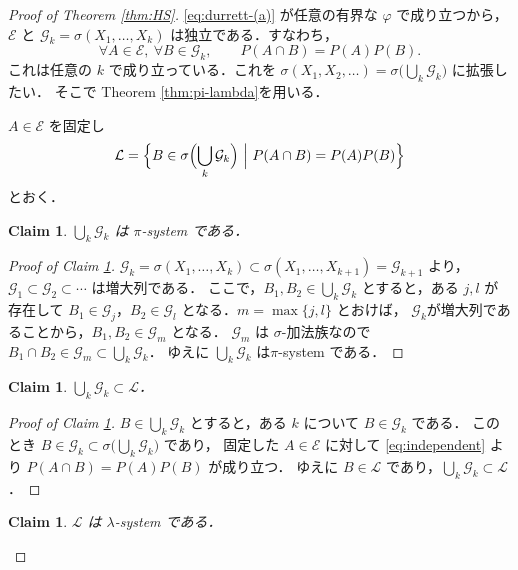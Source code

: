 \documentclass[a4paper,11pt,uplatex,dvipdfmx]{jsarticle}
\theoremstyle{plain}
\newtheorem{claim}[theorem]{Claim}
\theoremstyle{definition}
\begin{document}
\begin{proof}[Proof of Theorem \ref{thm:HS}]
\eqref{eq:durrett-(a)} が任意の有界な $\varphi$ で成り立つから，$\mathcal{E}$ と
$\mathcal{G}_k=\sigma(X_1,\dots,X_k)$ は独立である．すなわち，
\begin{equation}\label{eq:independent}
  \forall A\in\mathcal{E},\ \forall B\in\mathcal{G}_k,\qquad P(A\cap B)=P(A)P(B).
\end{equation}
これは任意の $k$ で成り立っている．これを
$\sigma(X_1,X_2,\dots)=\sigma\bigl(\bigcup_k\mathcal{G}_k\bigr)$ に拡張したい．
そこで Theorem \ref{thm:pi-lambda}を用いる．

$A\in\mathcal{E}$ を固定し
\[
  \mathcal{L}=\Bigl\{B\in\sigma\Bigl(\bigcup_k\mathcal{G}_k\Bigr)\ \Big|\ P(A\cap B)=P(A)P(B)\Bigr\}
\]
とおく．

\begin{claim}\label{cl:pi-system}
$\bigcup_k\mathcal{G}_k$ は $\pi$-system である．
\end{claim}

\begin{proof}[Proof of Claim \ref{cl:pi-system}]
$\mathcal{G}_k=\sigma(X_1,\dots,X_k)\subset\sigma(X_1,\dots,X_{k+1})=\mathcal{G}_{k+1}$ より，
$\mathcal{G}_1\subset\mathcal{G}_2\subset\cdots$ は増大列である．
ここで，$B_1,B_2\in\bigcup_k\mathcal{G}_k$ とすると，ある $j,l$ が存在して
$B_1\in\mathcal{G}_j$，$B_2\in\mathcal{G}_l$ となる．$m=\max\{j,l\}$ とおけば，
$\mathcal{G}_k$が増大列であることから，$B_1,B_2\in\mathcal{G}_m$ となる．
$\mathcal{G}_m$ は $\sigma$-加法族なので $B_1\cap B_2\in\mathcal{G}_m\subset\bigcup_k\mathcal{G}_k$．
ゆえに $\bigcup_k\mathcal{G}_k$ は$\pi$-system である．
\end{proof}

\begin{claim}\label{cl:subset}
$\bigcup_k\mathcal{G}_k\subset\mathcal{L}$．
\end{claim}

\begin{proof}[Proof of Claim \ref{cl:subset}]
$B\in\bigcup_k\mathcal{G}_k$ とすると，ある $k$ について $B\in\mathcal{G}_k$ である．
このとき $B\in\mathcal{G}_k\subset\sigma\bigl(\bigcup_k\mathcal{G}_k\bigr)$ であり，
固定した $A\in\mathcal{E}$ に対して \eqref{eq:independent} より $P(A\cap B)=P(A)P(B)$ が成り立つ．
ゆえに $B\in\mathcal{L}$ であり，$\bigcup_k\mathcal{G}_k\subset\mathcal{L}$．
\end{proof}

\begin{claim}\label{cl:lambda-system}
$\mathcal{L}$ は $\lambda$-system である．
\end{claim}


\end{proof}
\end{document}
